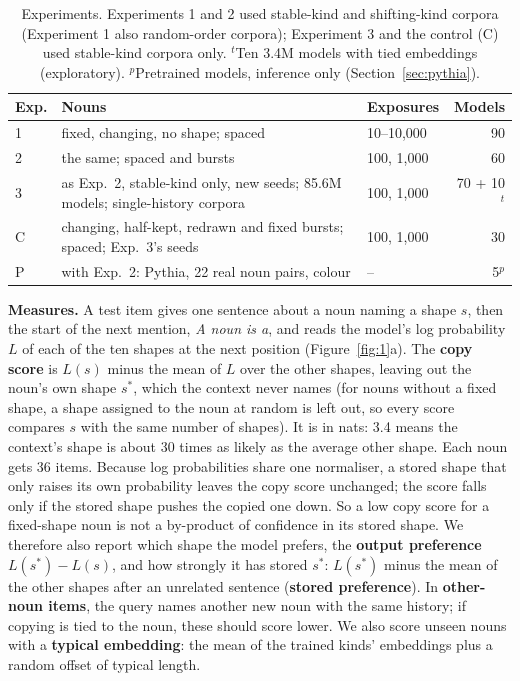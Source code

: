 \documentclass[11pt]{article}
\begin{document}
\begin{table}[t]
\centering
\small
\setlength{\tabcolsep}{2.5pt}
\begin{tabular}{@{}l>{\raggedright\arraybackslash}p{}lr@{}}
\toprule
Exp. & Nouns & Exposures & Models \\
\midrule
1 & fixed, changing, no shape; spaced & 10--10,000 & 90 \\
2 & the same; spaced and bursts & 100, 1,000 & 60 \\
3 & as Exp.~2, stable-kind only, new seeds; 85.6M models; single-history corpora & 100, 1,000 & 70 + 10$^t$ \\
C & changing, half-kept, redrawn and fixed bursts; spaced; Exp.~3's seeds & 100, 1,000 & 30 \\
P & with Exp.~2: Pythia, 22 real noun pairs, colour & -- & 5$^p$ \\
\bottomrule
\end{tabular}
\caption{Experiments. Experiments 1 and 2 used stable-kind and shifting-kind corpora (Experiment 1 also random-order corpora); Experiment 3 and the control (C) used stable-kind corpora only. $^t$Ten 3.4M models with tied embeddings (exploratory). $^p$Pretrained models, inference only (Section~\ref{sec:pythia}).}
\label{tab:exps}
\end{table}

\textbf{Measures.} A test item gives one sentence about a noun naming a shape $s$, then the start of the next mention, \emph{A \textit{noun} is a}, and reads the model's log probability $L$ of each of the ten shapes at the next position (Figure~\ref{fig:1}a). The \textbf{copy score} is $L(s)$ minus the mean of $L$ over the other shapes, leaving out the noun's own shape $s^*$, which the context never names (for nouns without a fixed shape, a shape assigned to the noun at random is left out, so every score compares $s$ with the same number of shapes). It is in nats: 3.4 means the context's shape is about 30 times as likely as the average other shape. Each noun gets 36 items. Because log probabilities share one normaliser, a stored shape that only raises its own probability leaves the copy score unchanged; the score falls only if the stored shape pushes the copied one down. So a low copy score for a fixed-shape noun is not a by-product of confidence in its stored shape. We therefore also report which shape the model prefers, the \textbf{output preference} $L(s^*) - L(s)$, and how strongly it has stored $s^*$: $L(s^*)$ minus the mean of the other shapes after an unrelated sentence (\textbf{stored preference}). In \textbf{other-noun items}, the query names another new noun with the same history; if copying is tied to the noun, these should score lower. We also score unseen nouns with a \textbf{typical embedding}: the mean of the trained kinds' embeddings plus a random offset of typical length.
\end{document}
